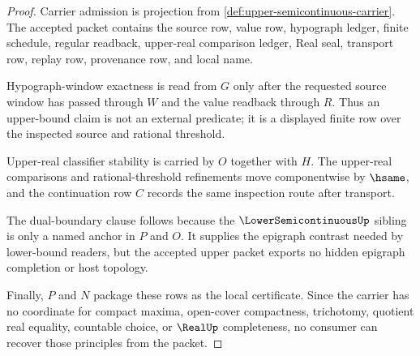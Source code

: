 \begin{proof}
Carrier admission is projection from
\autoref{def:upper-semicontinuous-carrier}. The accepted packet contains the
source row, value row, hypograph ledger, finite schedule, regular readback,
upper-real comparison ledger, Real seal, transport row, replay row, provenance
row, and local name.

Hypograph-window exactness is read from $G$ only after the requested source
window has passed through $W$ and the value readback through $R$. Thus an
upper-bound claim is not an external predicate; it is a displayed finite row
over the inspected source and rational threshold.

Upper-real classifier stability is carried by $O$ together with $H$. The
upper-real comparisons and rational-threshold refinements move componentwise
by $\hsame$, and the continuation row $C$ records the same inspection route
after transport.

The dual-boundary clause follows because the $\LowerSemicontinuousUp$ sibling
is only a named anchor in $P$ and $O$. It supplies the epigraph contrast needed
by lower-bound readers, but the accepted upper packet exports no hidden
epigraph completion or host topology.

Finally, $P$ and $N$ package these rows as the local certificate. Since the
carrier has no coordinate for compact maxima, open-cover compactness,
trichotomy, quotient real equality, countable choice, or $\RealUp$
completeness, no consumer can recover those principles from the packet.
\end{proof}

